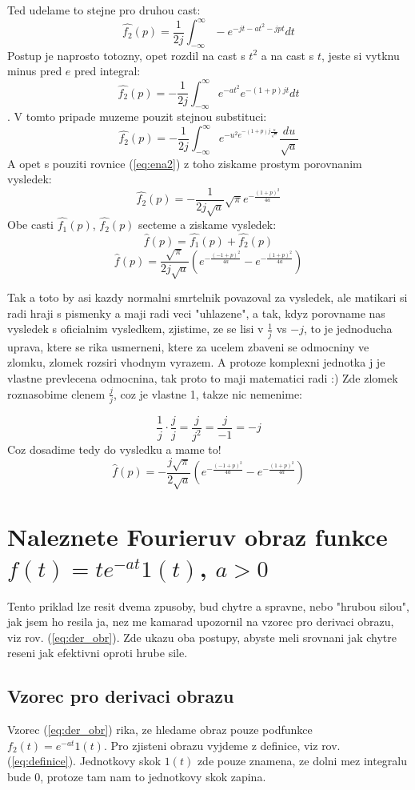 Ted udelame to stejne pro druhou cast:
$$\hat{f_2}(p)=\frac{1}{2j}\int_{-\infty}^{\infty}- e^{-jt-at^2-jpt} dt$$
Postup je naprosto totozny, opet rozdil na cast s $t^2$ a na cast s $t$, jeste si vytknu minus pred $e$ pred integral:
$$\hat{f_2}(p)=-\frac{1}{2j}\int_{-\infty}^{\infty} e^{-at^2}e^{-(1+p)jt}dt$$.
V tomto pripade muzeme pouzit stejnou substituci:
$$\hat{f_2}(p)=-\frac{1}{2j}\int_{-\infty}^{\infty} e^{-u^2 e^{-(1+p)j\frac{u}{\sqrt{a}}}}\frac{du}{\sqrt{a}}$$
A opet s pouziti rovnice (\ref{eq:ena2}) z toho ziskame prostym porovnanim vysledek:
$$\hat{f_2}(p)=-\frac{1}{2j\sqrt{a}}\sqrt{\pi}e^{-\frac{(1+p)^2}{4a}}$$
Obe casti $\hat{f_1}(p)$, $\hat{f_2}(p)$ secteme a ziskame vysledek:
$$\hat{f}(p)= \hat{f_1}(p)+\hat{f_2}(p)$$
$$\hat{f}(p)=\frac{\sqrt{\pi}}{2j\sqrt{a}}\left( e^{-\frac{(-1+p)^2}{4a}} - e^{-\frac{(1+p)^2}{4a}}\right)$$

Tak a toto by asi kazdy normalni smrtelnik povazoval za vysledek, ale matikari si radi hraji s pismenky a maji radi veci "uhlazene", a tak, kdyz porovname nas vysledek s oficialnim vysledkem, zjistime, ze se lisi v $\frac{1}{j}$ vs $-j$, to je jednoducha uprava, ktere se rika usmerneni, ktere za ucelem zbaveni se odmocniny ve zlomku, zlomek rozsiri vhodnym vyrazem. A protoze komplexni jednotka j je vlastne prevlecena odmocnina, tak proto to maji matematici radi :) Zde zlomek roznasobime clenem $\frac{j}{j}$, coz je vlastne 1, takze nic nemenime:

$$\frac{1}{j}\cdot \frac{j}{j} = \frac{j}{j^2} = \frac{j}{-1} =-j$$
Coz dosadime tedy do vysledku a mame to!
$$\hat{f}(p)=-\frac{j \sqrt{\pi}}{2\sqrt{a}}\left( e^{-\frac{(-1+p)^2}{4a}} - e^{-\frac{(1+p)^2}{4a}}\right)$$

\newpage

\section{Naleznete Fourieruv obraz funkce $f(t)=t e^{-at} 1(t)$, $a>0$}

Tento priklad lze resit dvema zpusoby, bud chytre a spravne, nebo "hrubou silou", jak jsem ho resila ja, nez me kamarad upozornil na vzorec pro derivaci obrazu, viz rov. (\ref{eq:der_obr}). Zde ukazu oba postupy, abyste meli srovnani jak chytre reseni jak efektivni oproti hrube sile.

\subsection{Vzorec pro derivaci obrazu}
Vzorec (\ref{eq:der_obr}) rika, ze hledame obraz pouze podfunkce $f_2(t)=e^{-at} 1(t)$. Pro zjisteni obrazu vyjdeme z definice, viz rov. (\ref{eq:definice}). Jednotkovy skok $1(t)$ zde pouze znamena, ze dolni mez integralu bude 0, protoze tam nam to jednotkovy skok zapina.

